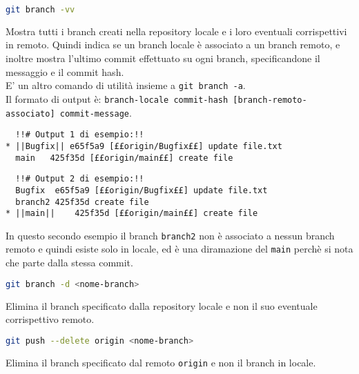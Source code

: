 \begin{lstlisting}[language=bash]
	git branch -vv
\end{lstlisting}
Mostra tutti i branch creati nella repository locale e i loro eventuali corrispettivi in remoto. Quindi indica se un branch locale è associato a un branch remoto, e inoltre mostra l'ultimo commit effettuato su ogni branch, specificandone il messaggio e il commit hash.\\
E' un altro comando di utilità insieme a \texttt{git branch -a}.\\
Il formato di output è: \texttt{branch-locale commit-hash [branch-remoto-associato] commit-message}.
\begin{lstlisting}
  !!# Output 1 di esempio:!!
* ||Bugfix|| e65f5a9 [££origin/Bugfix££] update file.txt
  main   425f35d [££origin/main££] create file
\end{lstlisting}
\begin{lstlisting}
  !!# Output 2 di esempio:!!
  Bugfix  e65f5a9 [££origin/Bugfix££] update file.txt
  branch2 425f35d create file
* ||main||    425f35d [££origin/main££] create file
\end{lstlisting}
In questo secondo esempio il branch \texttt{branch2} non è associato a nessun branch remoto e quindi esiste solo in locale, ed è una diramazione del \texttt{main} perchè si nota che parte dalla stessa commit.\\

\begin{lstlisting}[language=bash]
	git branch -d <nome-branch>
\end{lstlisting}
Elimina il branch specificato dalla repository locale e non il suo eventuale corrispettivo remoto.\\

\begin{lstlisting}[language=bash]
	git push --delete origin <nome-branch>
\end{lstlisting}
Elimina il branch specificato dal remoto \texttt{origin} e non il branch in locale.\\

\newpage

